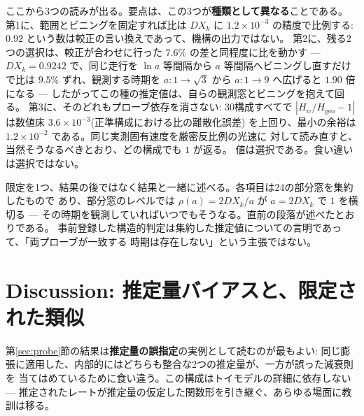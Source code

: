 \documentclass[a4paper,10pt,twocolumn]{ltjsarticle}
\begin{document}
ここから3つの読みが出る。要点は、この3つが\textbf{種類として異なる}ことである。
第1に、範囲とビニングを固定すれば比は $D X_k$ に $1.2\times10^{-3}$ の精度で比例する:
$0.92$ という数は較正の言い換えであって、機構の出力ではない。
第2に、残る2つの選択は、較正が合わせに行った $7.6\%$ の差と同程度に比を動かす ---
$D X_k=0.9242$ で、同じ走行を $\ln a$ 等間隔から $a$ 等間隔へビニングし直すだけで比は
$9.5\%$ ずれ、観測する時期を $a\colon1\to\sqrt3$ から $a\colon1\to9$ へ広げると
$1.90$ 倍になる --- したがってこの種の推定値は、自らの観測窓とビニングを抱えて回る。
第3に、そのどれもプローブ依存を消さない: 30構成すべてで
$|H_w/H_{\mathrm{geo}}-1|$ は数値床 $3.6\times10^{-3}$(正準構成における比の離散化誤差)
を上回り、最小の余裕は $1.2\times10^{-2}$ である。同じ実測固有速度を厳密反比例の光速に
対して読み直すと、当然そうなるべきとおり、どの構成でも $1$ が返る。
値は選択である。食い違いは選択ではない。

限定を1つ、結果の後ではなく結果と一緒に述べる。各項目は24の部分窓を集約したもので
あり、部分窓のレベルでは $\rho(a)=2D X_k/a$ が $a=2D X_k$ で $1$ を横切る ---
その時期を観測していればいつでもそうなる。直前の段落が述べたとおりである。
事前登録した構造的判定は集約した推定値についての言明であって、「両プローブが一致する
時期は存在しない」という主張ではない。

\section{Discussion: 推定量バイアスと、限定された類似}
\label{sec:discussion}

第\ref{sec:probe}節の結果は\textbf{推定量の誤指定}の実例として読むのが最もよい:
同じ膨張に適用した、内部的にはどちらも整合な2つの推定量が、一方が誤った減衰則を
当てはめているために食い違う。この構成はトイモデルの詳細に依存しない ---
推定されたレートが推定量の仮定した関数形を引き継ぐ、あらゆる場面に教訓は移る。
\end{document}
